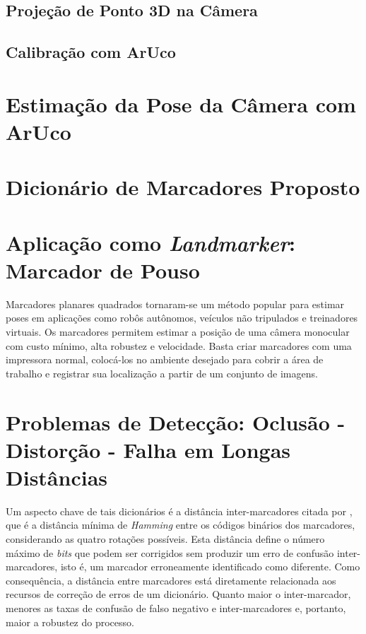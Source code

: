 \subsection{Projeção de Ponto 3D na Câmera}

\subsection{Calibração com ArUco}

\section{Estimação da Pose da Câmera com ArUco}

\section{Dicionário de Marcadores Proposto}

\section{Aplicação como \textit{Landmarker}: Marcador de Pouso}

Marcadores planares quadrados tornaram-se um método popular para estimar poses em aplicações como robôs autônomos, veículos não tripulados e treinadores virtuais. Os marcadores permitem estimar a posição de uma câmera monocular com custo mínimo, alta robustez e velocidade. Basta criar marcadores com uma impressora normal, colocá-los no ambiente desejado para cobrir a área de trabalho e registrar sua localização a partir de um conjunto de imagens.

\section{Problemas de Detecção: Oclusão - Distorção - Falha em Longas Distâncias}

Um aspecto chave de tais dicionários é a distância inter-marcadores citada por \citet{Fiala2010}, que é a distância mínima de \textit{Hamming} entre os códigos binários dos marcadores, considerando as quatro rotações possíveis. Esta distância define o número máximo de \textit{bits} que podem ser corrigidos sem produzir um erro de confusão inter-marcadores, isto é, um marcador erroneamente identificado como diferente. Como consequência, a distância entre marcadores está diretamente relacionada aos recursos de correção de erros de um dicionário. Quanto maior o inter-marcador, menores as taxas de confusão de falso negativo e inter-marcadores e, portanto, maior a robustez do processo.

